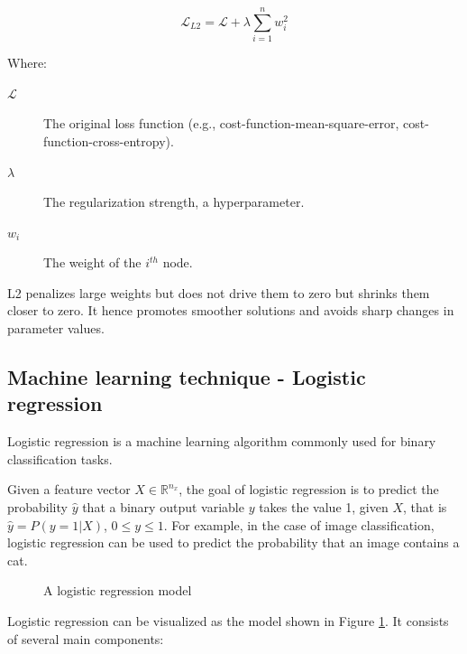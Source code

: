		\begin{equation}
			\mathcal{L}_{L2} = \mathcal{L} + \lambda \sum_{i=1}^n w_i^2
		\end{equation}
		
		Where:
		\begin{description}
			\item[$\mathcal{L}$] The original loss function (e.g., cost-function-mean-square-error, cost-function-cross-entropy).
			\item[$\lambda$] The regularization strength, a hyperparameter.
			\item[$w_i$] The weight of the $i^{th}$ node.
		\end{description}
		\bigskip
		
		
		L2 penalizes large weights but does not drive them to zero but shrinks them closer to zero. It hence promotes smoother solutions and avoids sharp changes in parameter values.




	\bigskip
	\subsection{Machine learning technique - Logistic regression}

		
		Logistic regression is a machine learning algorithm commonly used for binary classification tasks.
		
		Given a feature vector $X \in \mathbb{R}^{n_x}$, the goal of logistic regression is to predict the probability $\hat{y}$ that a binary output variable $y$ takes the value 1, given $X$, that is $\hat{y} = P(y=1|X)$, $0\le y\le1$. 
		For example, in the case of image classification, logistic regression can be used to predict the probability that an image contains a cat.
		
		\begin{figure}[H]
			\centering
			
			\caption{A logistic regression model}
			\label{fig:logisticregression}
		\end{figure}
		
		
		Logistic regression can be visualized as the model shown in Figure \ref{fig:logisticregression}. It consists of several main components:
		
